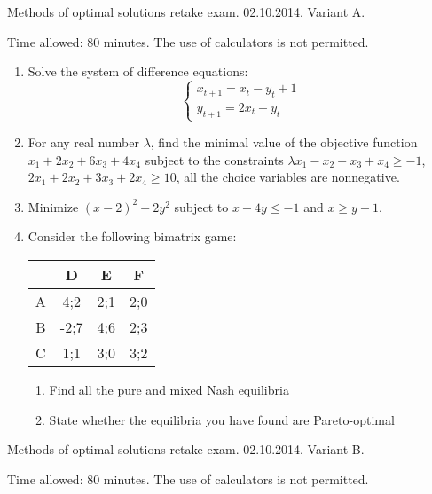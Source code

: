 \documentclass[12pt,a4paper]{article}
\begin{document}
Methods of optimal solutions retake exam. 02.10.2014. Variant A.

Time allowed: 80 minutes. The use of calculators is not permitted.

\begin{enumerate}

\item Solve the system of difference equations:
\[
\begin{cases}
x_{t+1}=x_t-y_t + 1\\
y_{t+1}=2x_t-y_t
\end{cases}
\]

\item For any real number $\lambda$, find the minimal value of the objective function $x_1+2x_2+6x_3+4x_4$ subject to the constraints  $\lambda x_1-x_2+x_3+x_4\geq -1$, $2x_1+2x_2+3x_3+2x_4 \geq 10$,  all the choice variables are nonnegative. 


\item Minimize $(x-2)^2+2 y^2$ subject to $x+4y\leq -1$ and $x\geq y+1$.


\item   Consider the following bimatrix game:


\begin{tabular}{c|ccc}
 & D & E & F \\ 
\hline 
A & 4;2 & 2;1 & 2;0  \\ 
B & -2;7 & 4;6 & 2;3  \\ 
C & 1;1 & 3;0 & 3;2  \\ 
\end{tabular} 

\begin{enumerate}
\item Find all the pure and mixed Nash equilibria
\item State whether the equilibria you have found are Pareto-optimal
\end{enumerate}

\end{enumerate}


Methods of optimal solutions retake exam. 02.10.2014. Variant B.

Time allowed: 80 minutes. The use of calculators is not permitted.
\end{document}
